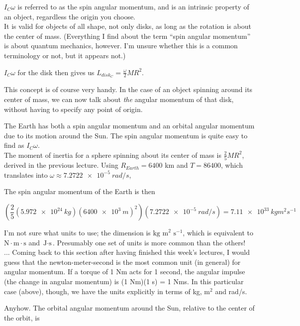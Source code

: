 \documentclass[12pt,a4paper]{report}
\begin{document}
$I_C \omega$ is referred to as the spin angular momentum, and is an intrinsic property of an object, regardless the origin you choose.\\
It is valid for objects of all shape, not only disks, as long as the rotation is about the center of mass.
(Everything I find about the term ``spin angular momentum'' is about quantum mechanics, however. I'm unsure whether this is a common terminology or not, but it appears not.)

$I_C \omega$ for the disk then gives us $\displaystyle L_{disk_C} = \frac{\omega}{2} M R^2$.

This concept is of course very handy. In the case of an object spinning around its center of mass, we can now talk about \emph{the} angular momentum of that disk, without having to specify any point of origin.

The Earth has both a spin angular momentum and an orbital angular momentum due to its motion around the Sun. The spin angular momentum is quite easy to find as $I_C \omega$.\\
The moment of inertia for a sphere spinning about its center of mass is $\displaystyle \frac{2}{5} M R^2$, derived in the previous lecture. Using $R_{Earth} = 6400$ km and $T = 86400$, which translates into $\omega \approx \SI{7.2722e-5}{rad/s}$, 

The spin angular momentum of the Earth is then

\begin{equation}
\left(\frac{2}{5} (\SI{5.972e24}{kg}) (\SI{6400e3}{m})^2\right) (\SI{7.2722e-5}{rad/s}) = \SI{7.11e33}{kg m^2 s^{-1}}
\end{equation}

I'm not sure what units to use; the dimension is $\text{kg m}^2 \text{ s}^{-1}$, which is equivalent to $\text{N}\cdot\text{m} \cdot \text{s}$ and $\text{J} \cdot \text{s}$. Presumably one set of units is more common than the others!\\
... Coming back to this section after having finished this week's lectures, I would guess that the newton-meter-second is the most common unit (in general) for angular momentum. If a torque of 1 Nm acts for 1 second, the angular impulse (the change in angular momentum) is (1 Nm)(1 s) = 1 Nms. In this particular case (above), though, we have the units explicitly in terms of kg, $\text{m}^2$ and rad/s.

Anyhow.
The orbital angular momentum around the Sun, relative to the center of the orbit, is
\end{document}
